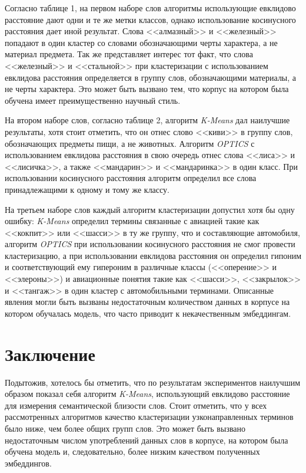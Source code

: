 \documentclass[12pt, a4paper]{article}
\begin{document}
\begin{results}
        \newpage

        Согласно таблице 1, на первом наборе слов алгоритмы использующие евклидово расстояние дают одни и те же метки классов, однако использование косинусного расстояния дает иной результат. Слова <<алмазный>> и <<железный>> попадают в один кластер со словами обозначающими черты характера, а не материал предмета. Так же представляет интерес тот факт, что слова <<железный>> и <<стальной>> при кластеризации с использованием евклидова расстояния определяется в группу слов, обозначающими материалы, а не черты характера. Это может быть вызвано тем, что корпус на котором была обучена имеет преимущественно научный стиль.

        На втором наборе слов, согласно таблице 2, алгоритм \textit{K-Means} дал наилучшие результаты, хотя стоит отметить, что он отнес слово <<киви>> в группу слов, обозначающих предметы пищи, а не животных. Алгоритм \textit{OPTICS} с использованием евклидова расстояния в свою очередь отнес слова <<лиса>> и <<лисичка>>, а также <<мандарин>> и <<мандаринка>> в один класс. При использовании косинусного расстояния алгоритм определил все слова принадлежащими к одному и тому же классу.

        На третьем наборе слов каждый алгоритм кластеризации допустил хотя бы одну ошибку: \textit{K-Means} определил термины связанные с авиацией такие как <<кокпит>> или <<шасси>> в ту же группу, что и составляющие автомобиля, алгоритм \textit{OPTICS} при использовании косинусного расстояния не смог провести кластеризацию, а при использовании евклидова расстояния он определил гипоним и соответствующий ему гипероним в различные классы (<<оперение>> и <<элероны>>) и авиационные понятия такие как <<шасси>>, <<закрылок>> и <<тангаж>> в один кластер с автомобильными терминами. Описанные явления могли быть вызваны недостаточным количеством данных в корпусе на котором обучалась модель, что часто приводит к некачественным эмбеддингам.
	\end{results}

	\section*{Заключение}
	    Подытожив, хотелось бы отметить, что по результатам экспериментов наилучшим образом показал себя алгоритм \textit{K-Means}, использующий евклидово расстояние для измерения семантической близости слов. Стоит отметить, что у всех рассмотренных алгоритмов качество кластеризации узконаправленных терминов было ниже, чем более общих групп слов. Это может быть вызвано недостаточным числом употреблений данных слов в корпусе, на котором была обучена модель и, следовательно, более низким качеством полученных эмбеддингов. 
\end{document}
